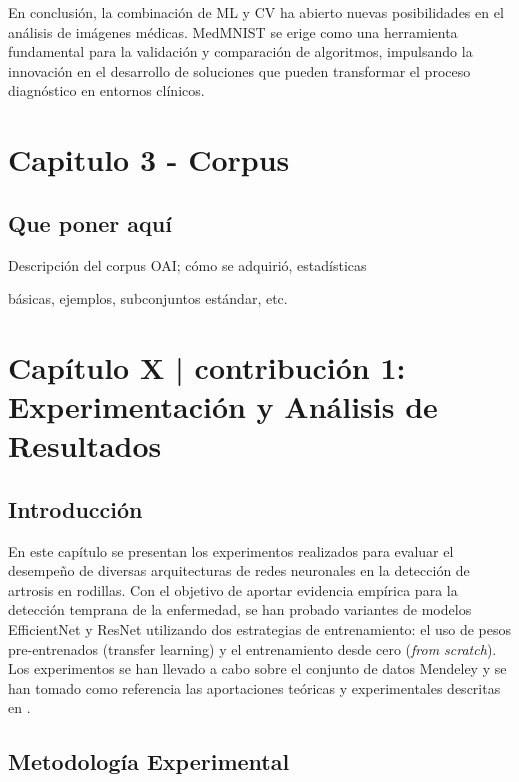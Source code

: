 \documentclass[11pt,spanish,listoffigures,listoftables]{tfgetsinf}
\begin{document}
En conclusión, la combinación de ML y CV ha abierto nuevas posibilidades en el análisis de imágenes médicas. MedMNIST se erige como una herramienta fundamental para la validación y comparación de algoritmos, impulsando la innovación en el desarrollo de soluciones que pueden transformar el proceso diagnóstico en entornos clínicos.



\chapter{Capitulo 3 - Corpus}
\section{Que poner aquí}
Descripción del corpus OAI; cómo se adquirió, estadísticas

básicas, ejemplos, subconjuntos estándar, etc.

\chapter{Capítulo X | contribución 1: Experimentación y Análisis de Resultados}

\section{Introducción}
En este capítulo se presentan los experimentos realizados para evaluar el desempeño de diversas arquitecturas de redes neuronales en la detección de artrosis en rodillas. Con el objetivo de aportar evidencia empírica para la detección temprana de la enfermedad, se han probado variantes de modelos EfficientNet y ResNet utilizando dos estrategias de entrenamiento: el uso de pesos pre-entrenados (transfer learning) y el entrenamiento desde cero (\textit{from scratch}). Los experimentos se han llevado a cabo sobre el conjunto de datos Mendeley \cite{chen2018knee} y se han tomado como referencia las aportaciones teóricas y experimentales descritas en \cite{efficientnet_paper}. 

\section{Metodología Experimental}
\end{document}
